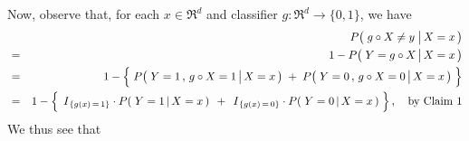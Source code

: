 \vskip 0.5cm
\noindent
Now, observe that, for each $x \in \Re^{d}$ and classifier $g : \Re^{d} \longrightarrow \{0,1\}$, we have
\begin{eqnarray*}
&&
	P\!\left(\,\left. \overset{{\color{white}.}}{g} \circ X \neq y \;\right\vert X = x \,\right)
\\
&=&
	1 - P\!\left(\,\left. Y = \overset{{\color{white}.}}{g} \circ X \,\right\vert X = x \,\right)
\\
&=&
	1 - \left\{\;
		\overset{{\color{white}.}}{P}\!\left(\,\left. Y = 1 \,,\, \overset{{\color{white}.}}{g} \circ X = 1 \,\right\vert X = x \,\right)
		\; + \;
		P\!\left(\,\left. Y = 0 \,,\, \overset{{\color{white}.}}{g} \circ X = 0 \,\right\vert X = x \,\right)
		\;\right\}
\\
&=&
	1 - \left\{\;
		\,\overset{{\color{white}.}}{I}_{\{g(x)\,=\,1\}} \cdot P\!\left(\,\left. Y = 1 \,\right\vert X = x \,\right)\,
		\; + \;
		\,\overset{{\color{white}.}}{I}_{\{g(x)\,=\,0\}} \cdot P\!\left(\,\left. Y = 0 \,\right\vert X = x \,\right)
		\;\right\},
	\quad
	\textnormal{by Claim 1}
\end{eqnarray*}
We thus see that
